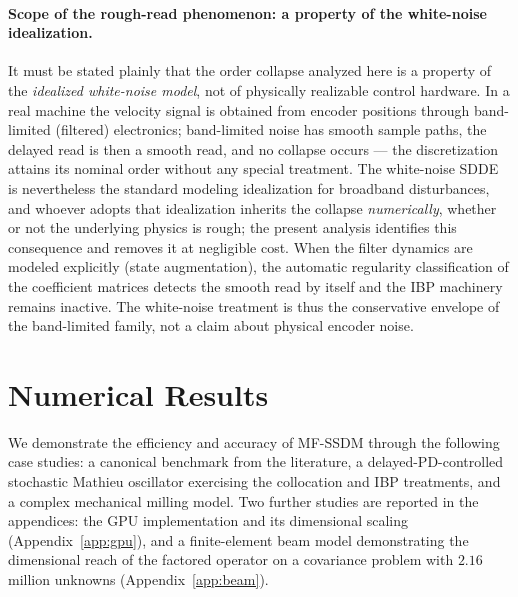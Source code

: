 \documentclass[preprint,12pt]{elsarticle}
\begin{document}
\paragraph{Scope of the rough-read phenomenon: a property of the white-noise idealization.}
It must be stated plainly that the order collapse analyzed here is a property of the \emph{idealized white-noise model}, not of physically realizable control hardware. In a real machine the velocity signal is obtained from encoder positions through band-limited (filtered) electronics; band-limited noise has smooth sample paths, the delayed read is then a smooth read, and no collapse occurs --- the discretization attains its nominal order without any special treatment. The white-noise SDDE is nevertheless the standard modeling idealization for broadband disturbances, and whoever adopts that idealization inherits the collapse \emph{numerically}, whether or not the underlying physics is rough; the present analysis identifies this consequence and removes it at negligible cost. When the filter dynamics are modeled explicitly (state augmentation), the automatic regularity classification of the coefficient matrices detects the smooth read by itself and the IBP machinery remains inactive. The white-noise treatment is thus the conservative envelope of the band-limited family, not a claim about physical encoder noise.

\section{Numerical Results}
\label{sec:results}

We demonstrate the efficiency and accuracy of MF-SSDM through the following case studies: a canonical benchmark from the literature, a delayed-PD-controlled stochastic Mathieu oscillator exercising the collocation and IBP treatments, and a complex mechanical milling model. Two further studies are reported in the appendices: the GPU implementation and its dimensional scaling (Appendix~\ref{app:gpu}), and a finite-element beam model demonstrating the dimensional reach of the factored operator on a covariance problem with $2.16$ million unknowns (Appendix~\ref{app:beam}).
\end{document}
